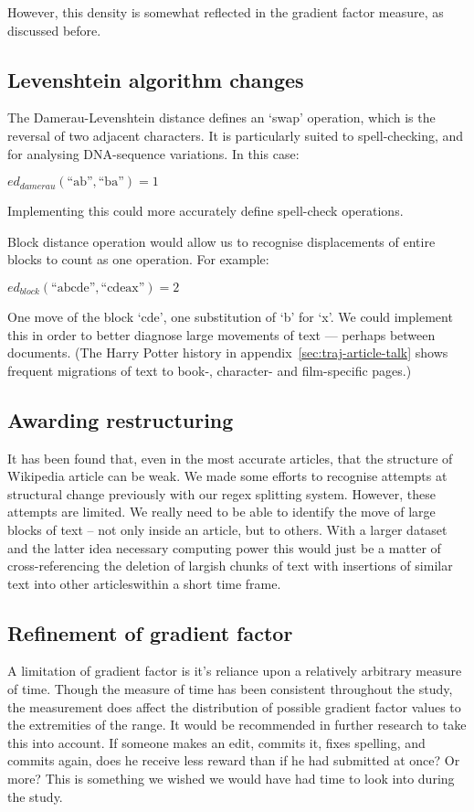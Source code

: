 However, this density is somewhat reflected in the gradient factor
measure, as discussed before.

\subsection*{Levenshtein algorithm changes}
The Damerau-Levenshtein distance defines an `swap' operation, which is
the reversal of two adjacent characters. It is particularly suited to
spell-checking, and for analysing DNA-sequence variations. In this
case:

$ed_{damerau}(\text{``ab''},\text{``ba''}) = 1$

Implementing this could more accurately define spell-check operations.

Block distance operation would allow us to recognise displacements of
entire blocks to count as one operation. For
example:

$ed_{block}(\text{``abcde''},\text{``cdeax''})= 2$

One move of the block `cde', one substitution of `b' for
`x'.\cite{Tichy1984} We could implement this in order to better
diagnose large movements of text --- perhaps between documents. (The
Harry Potter history in appendix~\ref{sec:traj-article-talk} shows
frequent migrations of text to book-, character- and film-specific
pages.)

\subsection*{Awarding restructuring}
\label{restructuring}
It has been found that, even in the most accurate articles, that the
structure of Wikipedia article can be weak.\cite{Giles2005} We made
some efforts to recognise attempts at structural change previously with our regex splitting system. However, these attempts are limited. We really
need to be able to identify the move of large blocks of text -- not
only inside an article, but to others. With a larger dataset and the latter idea
necessary computing power this would just be a matter of
cross-referencing the deletion of largish chunks of text with
insertions of similar text into other articleswithin a short time frame.

\subsection*{Refinement of gradient factor}
A limitation of gradient factor is it's reliance upon a relatively
arbitrary measure of time. Though the measure of time has been
consistent throughout the study, the measurement does affect the
distribution of possible gradient factor values to the extremities of
the range. It would be recommended in further research to take this
into account. If someone makes an edit, commits it, fixes spelling,
and commits again, does he receive less reward than if he had
submitted at once? Or more? This is something we wished we would have
had time to look into during the study.

